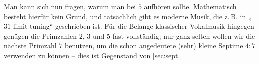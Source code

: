 Man kann sich nun fragen, warum man bei $5$ aufhören sollte. Mathematisch
besteht hierfür kein Grund, und tatsächlich gibt es moderne Musik, die z.\,B. in
„$31$-limit tuning“ geschrieben ist.  Für die Belange klassischer Vokalmusik
hingegen genügen die Primzahlen $2$, $3$ und $5$ fast vollständig; nur ganz
selten wollen wir die nächste Primzahl $7$ benutzen, um die schon angedeutete
(sehr) kleine Septime $4:7$ verwenden zu können – dies ist Gegenstand von
\cref{sec:sept}.

